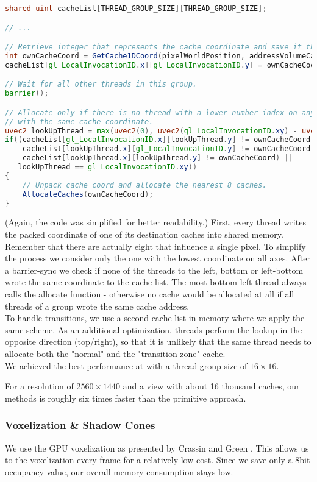 \documentclass[thesis.tex]{subfiles}
\begin{document}
\begin{lstlisting}[language=GLSL]
shared uint cacheList[THREAD_GROUP_SIZE][THREAD_GROUP_SIZE];

// ...

// Retrieve integer that represents the cache coordinate and save it the shared memory.
int ownCacheCoord = GetCache1DCoord(pixelWorldPosition, addressVolumeCascade);
cacheList[gl_LocalInvocationID.x][gl_LocalInvocationID.y] = ownCacheCoord;

// Wait for all other threads in this group.
barrier();

// Allocate only if there is no thread with a lower number index on any axis
// with the same cache coordinate.
uvec2 lookUpThread = max(uvec2(0), uvec2(gl_LocalInvocationID.xy) - uvec2(1));
if((cacheList[gl_LocalInvocationID.x][lookUpThread.y] != ownCacheCoord && 
    cacheList[lookUpThread.x][gl_LocalInvocationID.y] != ownCacheCoord &&
    cacheList[lookUpThread.x][lookUpThread.y] != ownCacheCoord) ||
   lookUpThread == gl_LocalInvocationID.xy))
{
	// Unpack cache coord and allocate the nearest 8 caches.
	AllocateCaches(ownCacheCoord);
}
\end{lstlisting}
(Again, the code was simplified for better readability.)
First, every thread writes the packed coordinate of one of its destination caches into shared memory.
Remember that there are actually eight that influence a single pixel.
To simplify the process we consider only the one with the lowest coordinate on all axes.
After a barrier-sync we check if none of the threads to the left, bottom or left-bottom wrote the same coordinate to the cache list.
The most bottom left thread always calls the allocate function - otherwise no cache would be allocated at all if all threads of a group wrote the same cache address.
\\
To handle transitions, we use a second cache list in memory where we apply the same scheme.
As an additional optimization, threads perform the lookup in the opposite direction (top/right), so that it is unlikely that the same thread needs to allocate both the "normal" and the "transition-zone" cache.
\\
We achieved the best performance at with a thread group size of $16\times16$.

For a resolution of $2560\times1440$ and a view with about 16 thousand caches, our methods is roughly six times faster than the primitive approach.

\subsubsection{Voxelization \& Shadow Cones}
We use the GPU voxelization as presented by Crassin and Green \cite{bib:openglinsightsvoxel}.
This allows us to the voxelization every frame for a relatively low cost.
Since we save only a 8bit occupancy value, our overall memory consumption stays low.
\end{document}
